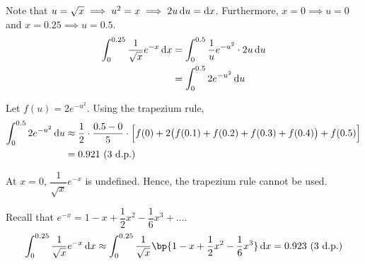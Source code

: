 \documentclass{echw}
\begin{document}
    \solution
        Note that $u = \sqrt{x} \implies u^2 = x \implies 2u \mathop{\mathrm{d}u} = \mathop{\mathrm{d}x}$. Furthermore, $x = 0 \implies u = 0$ and $x = 0.25 \implies u = 0.5$.
        \begin{align*}
            \int_0^{0.25} \dfrac1{\sqrt{x}} e^{-x} \mathop{\mathrm{d}x} &= \int_{0}^{0.5} \dfrac1u e^{-u^2} \cdot 2u \mathop{\mathrm{d}u}\\
            &= \int_0^{0.5} 2e^{-u^2} \mathop{\mathrm{d}u}
        \end{align*}

        Let $f(u) = 2e^{-u^2}$. Using the trapezium rule,
        \begin{align*}
            \int_0^{0.5} 2e^{-u^2} \mathop{\mathrm{d}u} &\approx \dfrac12 \cdot \dfrac{0.5 - 0}{5} \cdot \Big[f(0) + 2\big(f(0.1) + f(0.2) + f(0.3) + f(0.4)\big) + f(0.5) \Big]\\
            &= 0.921 \text{ (3 d.p.)}
        \end{align*}


        At $x = 0$, $\dfrac1{\sqrt{x}}e^{-x}$ is undefined. Hence, the trapezium rule cannot be used.

        Recall that $e^{-x} = 1 - x + \dfrac12 x^2 - \dfrac16 x^3 + \ldots$.
        \[
            \int_0^{0.25} \dfrac1{\sqrt{x}} e^{-x} \d x \approx \int_0^{0.25} \dfrac1{\sqrt x}\bp{1 - x + \dfrac12 x^2 - \dfrac16 x^3} \d x = 0.923 \todp{3}
        \]


    \problem{}
        \begin{center}
        \end{center}
\end{document}
